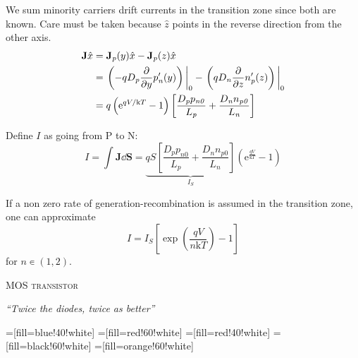 \documentclass[a4paper,10pt]{article}
\newcommand{\kb}{\mathrm{k}}
\newcommand{\kbt}{\kb T}
\begin{document}
\begin{multicols}{2}
  We sum minority carriers drift currents in the transition zone
  since both are known. Care must be taken because $\hat{z}$ points
  in the reverse direction from the other axis.
  \begin{equation*}
    \begin{split}
      \mathbf{J}\hat{x} &= \mathbf{J}_{\mathit{p}}(y)\hat{x} - \mathbf{J}_{\mathit{p}}(z)\hat{x} \\
      &= \eval{\left( -qD_{\mathit{p}} \pdv{}{y} p'_{\mathit{n}}(y) \right)}_0 - \eval{\left( q D_{\mathit{n}}
        \pdv{}{z} n'_{\mathit{p}}(z) \right)}_0\\
    &= q \left( \mathrm{e}^{qV/\kbt} -1 \right) \left[ \frac{D_{\mathit{p}} p_{\mathit{n0}}}{L_{\mathit{p}}} +
      \frac{D_{\mathit{n}} n_{\mathit{p0}}}{L_{\mathit{n}}}\right]
    \end{split}
  \end{equation*}

  Define $I$ as going from P to N:
  \begin{equation*}
      I = \int \mathbf{J} \dd{\mathbf{S}} =
      \underbrace{
        qS\left[ \frac{D_{\mathit{p}} p_{\mathit{n0}}}{L_{\mathit{p}}} +
      \frac{D_{\mathit{n}} n_{\mathit{p0}}}{L_{\mathit{n}}}\right]
  }_{I_{\mathit{S}}} \left( \mathrm{e}^{\frac{qV}{\kbt}}-1 \right)
  \end{equation*}

  If a non zero rate of generation-recombination is assumed in the
  transition zone, one can approximate
  \begin{equation*}
    \boxed{
      I =
      I_{\mathit{S}} \left[ \exp(\frac{qV}{n\kbt})-1 \right]
    }
  \end{equation*}
  for $n∊(1,2)$.


\end{multicols}


\newpage


\begin{center}
\textsc{\Huge MOS transistor}

\textit{``Twice the diodes, twice as better''}
\end{center}

\vspace{0.5cm}

    =[fill=blue!40!white]
    =[fill=red!60!white]
    =[fill=red!40!white]
    =[fill=black!60!white]
    =[fill=orange!60!white]
\end{document}
